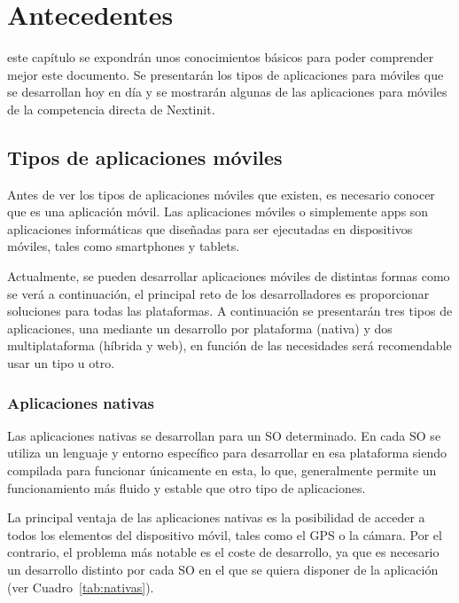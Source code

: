 \chapter{Antecedentes}
\label{chap:antecedentes}

 este capítulo se expondrán unos conocimientos básicos para poder comprender mejor este documento. Se presentarán 
los tipos de aplicaciones para móviles que se desarrollan hoy en día y se mostrarán algunas de las aplicaciones para móviles
de la competencia directa de Nextinit.

\section{Tipos de aplicaciones móviles}

Antes de ver los tipos de aplicaciones móviles que existen, es necesario conocer que es una aplicación móvil. Las aplicaciones
móviles o simplemente apps son aplicaciones informáticas que diseñadas para ser ejecutadas en dispositivos móviles, tales 
como smartphones y tablets.

Actualmente, se pueden desarrollar aplicaciones móviles de distintas formas \cite{ANADES} como se verá a continuación, el 
principal reto de los desarrolladores es proporcionar soluciones para todas las plataformas.  A continuación se presentarán 
tres tipos de aplicaciones, una mediante un desarrollo por plataforma (nativa) y dos multiplataforma (híbrida y web), en 
función de las necesidades será recomendable usar un tipo u otro.

\subsection{Aplicaciones nativas}

Las aplicaciones nativas se desarrollan para un \acf{SO} determinado. En cada \acs{SO} se utiliza un lenguaje y entorno 
específico para desarrollar en esa plataforma siendo compilada para funcionar únicamente en esta, lo que, generalmente 
permite un funcionamiento más fluido y estable que otro tipo de aplicaciones.

La principal ventaja de las aplicaciones nativas es la posibilidad de acceder a todos los elementos del dispositivo móvil, tales
como el \acs{GPS} o la cámara. Por el contrario, el problema más notable es el coste de desarrollo, ya que es necesario
un desarrollo distinto por cada \acs{SO} en el que se quiera disponer de la aplicación (ver Cuadro~\ref{tab:nativas}).

